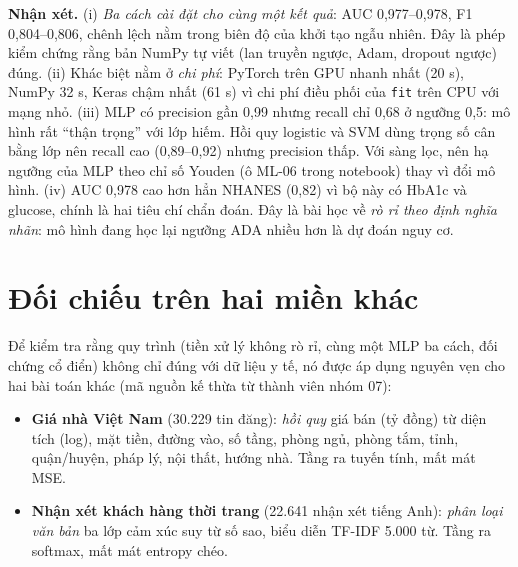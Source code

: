 \textbf{Nhận xét.} (i) \emph{Ba cách cài đặt cho cùng một kết quả}: AUC 0,977–0,978, F1 0,804–0,806, chênh lệch nằm trong biên độ của khởi tạo ngẫu nhiên. Đây là phép kiểm chứng rằng bản NumPy tự viết (lan truyền ngược, Adam, dropout ngược) đúng. (ii) Khác biệt nằm ở \emph{chi phí}: PyTorch trên GPU nhanh nhất (20 s), NumPy 32 s, Keras chậm nhất (61 s) vì chi phí điều phối của \texttt{fit} trên CPU với mạng nhỏ. (iii) MLP có precision gần 0,99 nhưng recall chỉ 0,68 ở ngưỡng 0,5: mô hình rất ``thận trọng'' với lớp hiếm. Hồi quy logistic và SVM dùng trọng số cân bằng lớp nên recall cao (0,89–0,92) nhưng precision thấp. Với sàng lọc, nên hạ ngưỡng của MLP theo chỉ số Youden (ô ML-06 trong notebook) thay vì đổi mô hình. (iv) AUC 0,978 cao hơn hẳn NHANES (0,82) vì bộ này có HbA1c và glucose, chính là hai tiêu chí chẩn đoán. Đây là bài học về \emph{rò rỉ theo định nghĩa nhãn}: mô hình đang học lại ngưỡng ADA nhiều hơn là dự đoán nguy cơ.

\section{Đối chiếu trên hai miền khác}
\label{sec:ch2-domains}

Để kiểm tra rằng quy trình (tiền xử lý không rò rỉ, cùng một MLP ba cách, đối chứng cổ điển) không chỉ đúng với dữ liệu y tế, nó được áp dụng nguyên vẹn cho hai bài toán khác (mã nguồn kế thừa từ thành viên nhóm 07):
\begin{itemize}
  \item \textbf{Giá nhà Việt Nam} (30.229 tin đăng): \emph{hồi quy} giá bán (tỷ đồng) từ diện tích (log), mặt tiền, đường vào, số tầng, phòng ngủ, phòng tắm, tỉnh, quận/huyện, pháp lý, nội thất, hướng nhà. Tầng ra tuyến tính, mất mát MSE.
  \item \textbf{Nhận xét khách hàng thời trang} (22.641 nhận xét tiếng Anh): \emph{phân loại văn bản} ba lớp cảm xúc suy từ số sao, biểu diễn TF-IDF 5.000 từ. Tầng ra softmax, mất mát entropy chéo.
\end{itemize}

